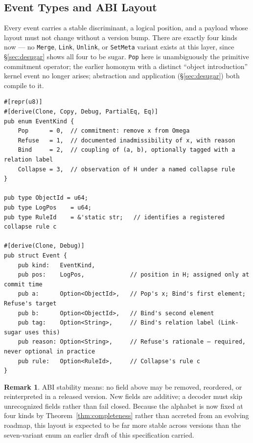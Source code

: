 \documentclass[12pt]{article}
\theoremstyle{definition}
\newtheorem{remark}{Remark}
\begin{document}
\subsection{Event Types and ABI Layout}
\label{sec:rust-abi}

Every event carries a stable discriminant, a logical position, and a payload whose layout must not change without a version bump. There are exactly four kinds now — no \texttt{Merge}, \texttt{Link}, \texttt{Unlink}, or \texttt{SetMeta} variant exists at this layer, since \S\ref{sec:desugar} shows all four to be sugar. \texttt{Pop} here is unambiguously the primitive commitment operator; the earlier homonym with a distinct ``object introduction'' kernel event no longer arises; abstraction and application (\S\ref{sec:desugar}) both compile to it.

\begin{verbatim}
#[repr(u8)]
#[derive(Clone, Copy, Debug, PartialEq, Eq)]
pub enum EventKind {
    Pop      = 0,  // commitment: remove x from Omega
    Refuse   = 1,  // documented inadmissibility of x, with reason
    Bind     = 2,  // coupling of (a, b), optionally tagged with a relation label
    Collapse = 3,  // observation of H under a named collapse rule
}

pub type ObjectId = u64;
pub type LogPos    = u64;
pub type RuleId    = &'static str;   // identifies a registered collapse rule c

#[derive(Clone, Debug)]
pub struct Event {
    pub kind:   EventKind,
    pub pos:    LogPos,             // position in H; assigned only at commit time
    pub a:      Option<ObjectId>,   // Pop's x; Bind's first element; Refuse's target
    pub b:      Option<ObjectId>,   // Bind's second element
    pub tag:    Option<String>,     // Bind's relation label (Link-sugar uses this)
    pub reason: Option<String>,     // Refuse's rationale — required, never optional in practice
    pub rule:   Option<RuleId>,     // Collapse's rule c
}
\end{verbatim}

\begin{remark}
ABI stability means: no field above may be removed, reordered, or reinterpreted in a released version. New fields are additive; a decoder must skip unrecognized fields rather than fail closed. Because the alphabet is now fixed at four kinds by Theorem~\ref{thm:completeness} rather than accreted from an evolving roadmap, this layout is expected to be far more stable across versions than the seven-variant enum an earlier draft of this specification carried.
\end{remark}
\end{document}
